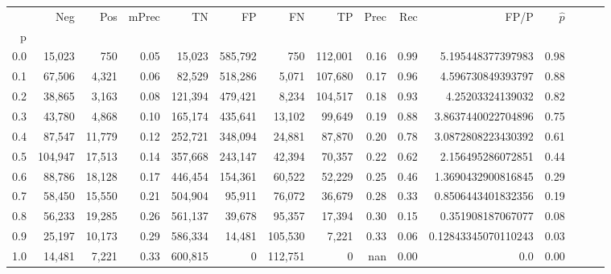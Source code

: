 \begin{tabular}{rrrrrrrrrrrrrrr}
\toprule
{} &      Neg &     Pos & mPrec &       TN &       FP &       FN &       TP &  Prec &   Rec &                 FP/P & $\hat{p}$ \\
p   &          &         &       &          &          &          &          &       &       &                      &           \\
\midrule
0.0 &   15,023 &     750 &  0.05 &   15,023 &  585,792 &      750 &  112,001 &  0.16 &  0.99 &    5.195448377397983 &      0.98 \\
0.1 &   67,506 &   4,321 &  0.06 &   82,529 &  518,286 &    5,071 &  107,680 &  0.17 &  0.96 &    4.596730849393797 &      0.88 \\
0.2 &   38,865 &   3,163 &  0.08 &  121,394 &  479,421 &    8,234 &  104,517 &  0.18 &  0.93 &     4.25203324139032 &      0.82 \\
0.3 &   43,780 &   4,868 &  0.10 &  165,174 &  435,641 &   13,102 &   99,649 &  0.19 &  0.88 &   3.8637440022704896 &      0.75 \\
0.4 &   87,547 &  11,779 &  0.12 &  252,721 &  348,094 &   24,881 &   87,870 &  0.20 &  0.78 &   3.0872808223430392 &      0.61 \\
0.5 &  104,947 &  17,513 &  0.14 &  357,668 &  243,147 &   42,394 &   70,357 &  0.22 &  0.62 &    2.156495286072851 &      0.44 \\
0.6 &   88,786 &  18,128 &  0.17 &  446,454 &  154,361 &   60,522 &   52,229 &  0.25 &  0.46 &   1.3690432900816845 &      0.29 \\
0.7 &   58,450 &  15,550 &  0.21 &  504,904 &   95,911 &   76,072 &   36,679 &  0.28 &  0.33 &   0.8506443401832356 &      0.19 \\
0.8 &   56,233 &  19,285 &  0.26 &  561,137 &   39,678 &   95,357 &   17,394 &  0.30 &  0.15 &    0.351908187067077 &      0.08 \\
0.9 &   25,197 &  10,173 &  0.29 &  586,334 &   14,481 &  105,530 &    7,221 &  0.33 &  0.06 &  0.12843345070110243 &      0.03 \\
1.0 &   14,481 &   7,221 &  0.33 &  600,815 &        0 &  112,751 &        0 &   nan &  0.00 &                  0.0 &      0.00 \\
\bottomrule
\end{tabular}
